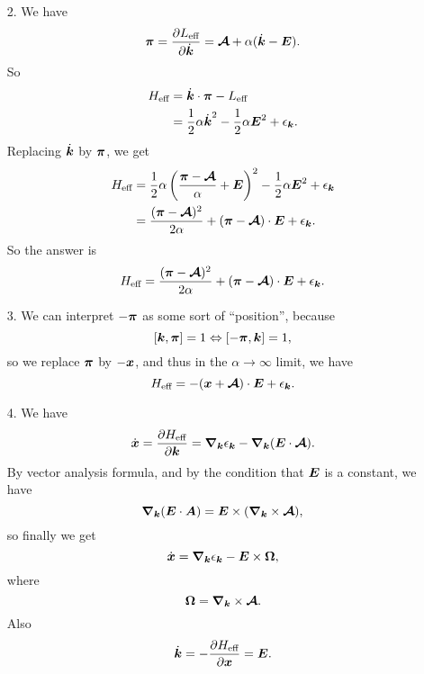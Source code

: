 \documentclass[hyperref, a4paper]{article}
\begin{document}
\begin{itemize}
\item[2.] We have 
\begin{equation}
    \vb*{\pi} = \pdv{L_{\text{eff}}}{\dot{\vb*{k}}} = \vb*{\mathcal{A}} + \alpha (\dot{\vb*{k}} - \vb*{E}).
\end{equation}
So 
\[
    \begin{aligned}
        H_{\text{eff}} &= \dot{\vb*{k}} \cdot \vb*{\pi} - L_{\text{eff}} \\
        &= \frac{1}{2} \alpha \dot{\vb*{k}}^2 - \frac{1}{2} \alpha \vb*{E}^2 + \epsilon_{\vb*{k}}.
    \end{aligned}
\]
Replacing $\dot{\vb*{k}}$ by $\vb*{\pi}$, 
we get 
\[
    \begin{aligned}
        H_{\text{eff}} &= \frac{1}{2} \alpha \left( \frac{\vb*{\pi} - \vb*{\mathcal{A}}}{\alpha} + \vb*{E} \right)^2
        - \frac{1}{2} \alpha \vb*{E}^2 + \epsilon_{\vb*{k}} \\
        &= \frac{(\vb*{\pi} - \vb*{\mathcal{A}})^2}{2 \alpha} + (\vb*{\pi} - \vb*{\mathcal{A}}) \cdot \vb*{E} + \epsilon_{\vb*{k}}.
    \end{aligned}
\]
So the answer is 
\begin{equation}
    H_{\text{eff}} = \frac{(\vb*{\pi} - \vb*{\mathcal{A}})^2}{2 \alpha} + (\vb*{\pi} - \vb*{\mathcal{A}}) \cdot \vb*{E} + \epsilon_{\vb*{k}}.
\end{equation}

\item[3.] We can interpret $-\vb*{\pi}$ as some sort of ``position'',
because 
\[
    \comm{\vb*{k}}{\vb*{\pi}} = 1 \Leftrightarrow \comm{- \vb*{\pi}}{\vb*{k}} = 1,
\]
so we replace $\vb*{\pi}$ by $- \vb*{x}$, and thus in the $\alpha \to \infty$ limit, we have
\begin{equation}
    H_{\text{eff}} = - (\vb*{x} + \vb*{\mathcal{A}}) \cdot \vb*{E} + \epsilon_{\vb*{k}}.
\end{equation}

\item[4.] We have 
\[
    \dot{\vb*{x}} = \pdv{H_{\text{eff}}}{\vb*{k}} = \grad_{\vb*{k}} \epsilon_{\vb*{k}} - \grad_{\vb*{k}} (\vb*{E} \cdot \vb*{\mathcal{A}}).
\]
By vector analysis formula, and by the condition that $\vb*{E}$ is a constant,
we have 
\[
    \grad_{\vb*{k}} (\vb*{E} \cdot \mathcal{\vb*{A}}) = \vb*{E} \times (\grad_{\vb*{k}} \times \vb*{\mathcal{A}}),
\]
so finally we get
\begin{equation}
    \dot{\vb*{x}} = \grad_{\vb*{k}} \epsilon_{\vb*{k}} - \vb*{E} \times \vb*{\Omega},
    \label{eq:x-eom}
\end{equation}
where 
\begin{equation}
    \vb*{\Omega} = \grad_{\vb*{k}} \times \vb*{\mathcal{A}}.
\end{equation}
Also 
\begin{equation}
    \dot{\vb*{k}} = - \pdv{H_{\text{eff}}}{\vb*{x}} = \vb*{E}.
    \label{eq:k-eom}
\end{equation}


\end{itemize}
\end{document}
